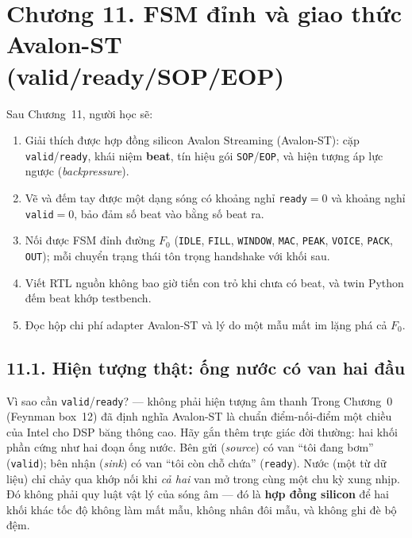 \clearpage
{}
\section*{Chương 11. FSM đỉnh và giao thức Avalon-ST (valid/ready/SOP/EOP)}

\begin{learningobj}
Sau Chương~11, người học sẽ:
\begin{enumerate}[leftmargin=1.4em]
    \item Giải thích được hợp đồng silicon Avalon Streaming (Avalon-ST): cặp \texttt{valid}/\texttt{ready}, khái niệm \textbf{beat}, tín hiệu gói \texttt{SOP}/\texttt{EOP}, và hiện tượng áp lực ngược (\emph{backpressure}).
    \item Vẽ và đếm tay được một dạng sóng có khoảng nghỉ \texttt{ready}$=0$ và khoảng nghỉ \texttt{valid}$=0$, bảo đảm số beat vào bằng số beat ra.
    \item Nối được FSM đỉnh đường $F_0$ (\texttt{IDLE}, \texttt{FILL}, \texttt{WINDOW}, \texttt{MAC}, \texttt{PEAK}, \texttt{VOICE}, \texttt{PACK}, \texttt{OUT}); mỗi chuyển trạng thái tôn trọng handshake với khối sau.
    \item Viết RTL nguồn không bao giờ tiến con trỏ khi chưa có beat, và twin Python đếm beat khớp testbench.
    \item Đọc hộp chi phí adapter Avalon-ST và lý do một mẫu mất im lặng phá cả $F_0$.
\end{enumerate}
\end{learningobj}

\subsection*{11.1. Hiện tượng thật: ống nước có van hai đầu}

\begin{firstprin}{Vì sao cần \texttt{valid}/\texttt{ready}? --- không phải hiện tượng âm thanh}
Trong Chương~0 (Feynman box~12) đã định nghĩa Avalon-ST là chuẩn điểm-nối-điểm một chiều của Intel cho DSP băng thông cao. Hãy gắn thêm trực giác đời thường: hai khối phần cứng như hai đoạn ống nước. Bên gửi (\emph{source}) có van ``tôi đang bơm'' (\texttt{valid}); bên nhận (\emph{sink}) có van ``tôi còn chỗ chứa'' (\texttt{ready}). Nước (một từ dữ liệu) chỉ chảy qua khớp nối khi \emph{cả hai} van mở trong cùng một chu kỳ xung nhịp. Đó không phải quy luật vật lý của sóng âm --- đó là \textbf{hợp đồng silicon} để hai khối khác tốc độ không làm mất mẫu, không nhân đôi mẫu, và không ghi đè bộ đệm.
\end{firstprin}

